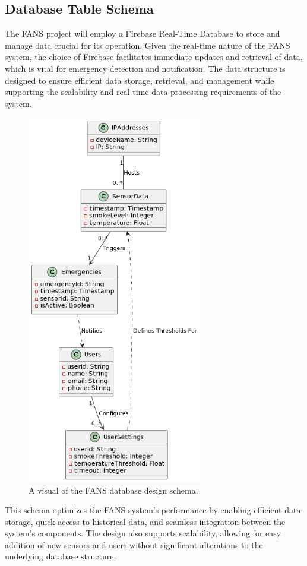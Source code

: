 \subsection{Database Table Schema}

The FANS project will employ a Firebase Real-Time Database to store and manage data crucial for its operation. Given
the real-time nature of the FANS system, the choice of Firebase facilitates immediate updates and retrieval of data,
which is vital for emergency detection and notification. The data structure is designed to ensure efficient data
storage, retrieval, and management while supporting the scalability and real-time data processing requirements of the
system.

\begin{figure}[H]
    \centering
    \includegraphics[width=3in]{../assets/DatabaseTableDesign.png}
    \caption{A visual of the FANS database design schema.}
\end{figure}

This schema optimizes the FANS system's performance by enabling efficient data storage, quick access to historical
data, and seamless integration between the system's components. The design also supports scalability, allowing for easy
addition of new sensors and users without significant alterations to the underlying database structure.
